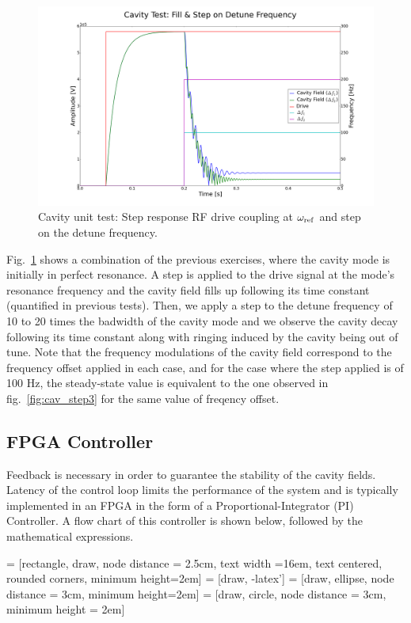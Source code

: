 \documentclass[a4paper,12pt]{article}
\begin{document}
\begin{figure}
\centering
\includegraphics[scale=0.27]{../figures/cavity_test_detune.png}
\caption{Cavity unit test: Step response RF drive coupling at $\omega_{\rm ref}$ and step on the detune frequency.}
\label{fig:cav_step4}
\end{figure}

Fig.~\ref{fig:cav_step4} shows a combination of the previous exercises, where the cavity mode is initially in perfect resonance. A step is applied to the drive signal at the mode's resonance frequency and the cavity field fills up following its time constant (quantified in previous tests). Then, we apply a step to the detune frequency of 10 to 20 times the badwidth of the cavity mode and we observe the cavity decay following its time constant along with ringing induced by the cavity being out of tune. Note that the frequency modulations of the cavity field correspond to the frequency offset applied in each case, and for the case where the step applied is of 100 Hz, the steady-state value is equivalent to the one observed in fig.~\ref{fig:cav_step3} for the same value of freqency offset.

\subsection{FPGA Controller}

Feedback is necessary in order to guarantee the stability of the cavity fields. Latency of the control loop limits the performance of the system and is typically implemented in an FPGA in the form of a Proportional-Integrator (PI) Controller. A flow chart of this controller is shown below, followed by the mathematical expressions. 

 = [rectangle, draw, node distance = 2.5cm, text width =16em, text centered, rounded corners, minimum height=2em]
 = [draw, -latex']
 = [draw, ellipse,  node distance = 3cm, minimum height=2em]
 = [draw, circle, node distance = 3cm, minimum height = 2em]
\end{document}
